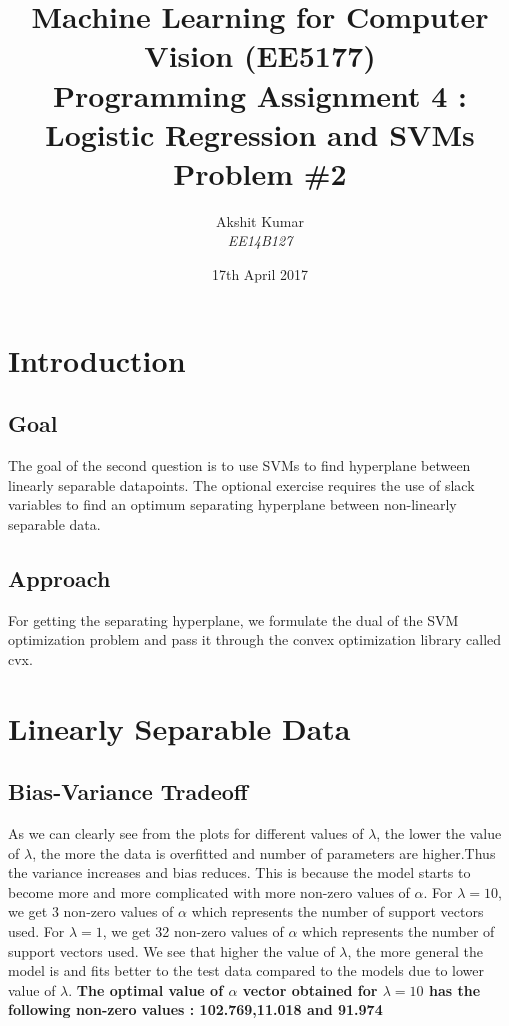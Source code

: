 \documentclass[english]{article}
\begin{document}
\title{Machine Learning for Computer Vision (EE5177) \\ Programming Assignment 4 : Logistic Regression and SVMs \\ Problem \#2}

\author{Akshit Kumar \\ \emph{EE14B127}}

\date{17th April 2017}

\maketitle
\tableofcontents{}

\section{Introduction}

\subsection{Goal}
The goal of the second question is to use SVMs to find hyperplane between linearly separable datapoints. The optional exercise requires the use of slack variables to find an optimum separating hyperplane between non-linearly separable data.
\subsection{Approach}
For getting the separating hyperplane, we formulate the dual of the SVM optimization problem and pass it through the convex optimization library called cvx.

\section{Linearly Separable Data}
\subsection{Bias-Variance Tradeoff}
As we can clearly see from the plots for different values of $\lambda$, the lower the value of $\lambda$, the more the data is overfitted and number of parameters are higher.Thus the variance increases and bias reduces. This is because the model starts to become more and more complicated with more non-zero values of $\alpha$. For $\lambda = 10$, we get 3 non-zero values of $\alpha$ which represents the number of support vectors used. For $\lambda = 1$, we get 32 non-zero values of $\alpha$ which represents the number of support vectors used.
We see that higher the value of $\lambda$, the more general the model is and fits better to the test data compared to the models due to lower value of $\lambda$.
\newline 
\newline
\textbf{
The optimal value of $\alpha$ vector obtained for $\lambda = 10$ has the following non-zero values : 102.769,11.018 and 91.974
}
\end{document}
